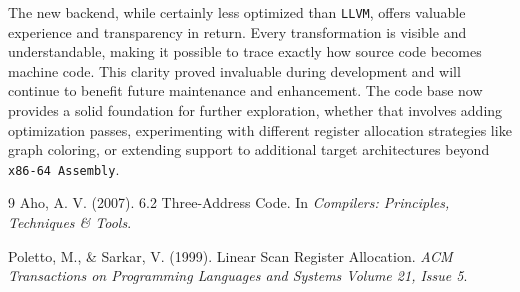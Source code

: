 \documentclass[11pt]{article}
\newcommand{\llvm}{\texttt{LLVM}}
\newcommand{\asm}{\texttt{x86-64 Assembly}}
\begin{document}
The new backend, while certainly less optimized than \llvm, offers valuable experience and transparency in return. Every transformation is visible and understandable, making it possible to trace exactly how source code becomes machine code. This clarity proved invaluable during development and will continue to benefit future maintenance and enhancement. The code base now provides a solid foundation for further exploration, whether that involves adding optimization passes, experimenting with different register allocation strategies like graph coloring, or extending support to additional target architectures beyond \asm.

\newpage

\begin{thebibliography}{9}
	Aho, A. V. (2007). 6.2 Three-Address Code. In \textit{Compilers: Principles, Techniques \& Tools}.

	Poletto, M., \& Sarkar, V. (1999). Linear Scan Register Allocation. \textit{ACM Transactions on Programming Languages and Systems Volume 21, Issue 5}.
\end{thebibliography}
\end{document}
